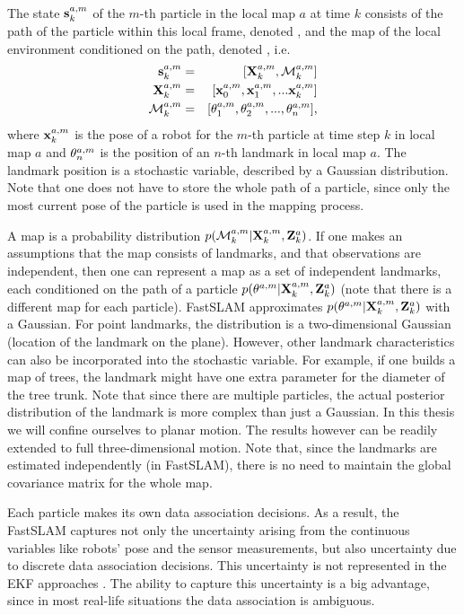 The state $\s{k}{a}{m}$ of the $m$-th particle in the local map $a$
at time $k$ consists of the path of the particle within this local
frame, denoted , and the map of the local environment
conditioned on the path, denoted , i.e.
\begin{eqnarray}
 \s{k}{a}{m}    &=& [\Xall{k}{a}{m}, \map{k}{a}{m} ]\\
 \Xall{k}{a}{m} &=& [\x{0}{a}{m}, \x{1}{a}{m}, ... \x{k}{a}{m}]\\
 \map{k}{a}{m}  &=& [\mape{a}{m}{1}, \mape{a}{m}{2}, ..., \mape{a}{m}{n}],
\end{eqnarray}
where $\x{k}{a}{m}$ is the pose of a robot for the $m$-th particle at
time step $k$ in local map $a$ and $\mape{a}{m}{n}$ is the position
of an $n$-th landmark in local map $a$. The landmark
position is a stochastic variable, described by a Gaussian
distribution. Note that one does not have to store the whole path of a particle, 
since only the most current pose of the particle is used in the mapping process.

A map is a probability distribution
$p(\map{k}{a}{m}|\Xall{k}{a}{m},\Zall{k}{a})$. If one makes an
assumptions that the map consists of landmarks, and that observations
are independent, then one can represent a map as a set of independent
landmarks, each conditioned on the path of a particle
$p(\mape{a}{m}{}|\Xall{k}{a}{m},\Zall{k}{a})$ (note that there is a
different map for each particle). FastSLAM approximates
$p(\mape{a}{m}{}|\Xall{k}{a}{m},\Zall{k}{a})$ with a Gaussian.  For
point landmarks, the distribution is a two-dimensional Gaussian
(location of the landmark on the plane). However, other landmark
characteristics can also be incorporated into the stochastic
variable. For example, if one builds a map of trees, the landmark
might have one extra parameter for the diameter of the tree trunk.
Note that since there are multiple particles, the actual posterior
distribution of the landmark is more complex than just a Gaussian. In
this thesis we will confine ourselves to planar motion. The
results however can be readily extended to full three-dimensional motion. Note
that, since the landmarks are estimated independently (in FastSLAM),
there is no need to maintain the global covariance matrix for the
whole map.

Each particle makes its own data association decisions. As a result,
the FastSLAM captures not only the uncertainty arising from the
continuous variables like robots' pose and the sensor measurements,
but also uncertainty due to discrete data association decisions.  This
uncertainty is not represented in the EKF approaches \cite{ekf_slam}.
The ability to capture this uncertainty is a big advantage, since in
most real-life situations the data association is ambiguous.

